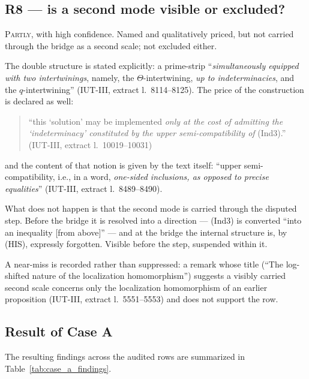 \documentclass[11pt,a4paper]{article}
\theoremstyle{definition}
\newcommand{\anchor}[2]{(#1, extract l.~#2)}
\begin{document}
\subsection{R8 --- is a second mode visible or excluded?}

\textsc{Partly}, with high confidence. Named and qualitatively priced, but not
carried through the bridge as a second scale; not excluded either.

The double structure is stated explicitly: a prime-strip ``\emph{simultaneously
equipped with two intertwinings}, namely, the $\Theta$-intertwining, \emph{up to
indeterminacies}, and the $q$-intertwining'' \anchor{IUT-III}{8114--8125}. The
price of the construction is declared as well:

\begin{quote}\small
``this `solution' may be implemented \emph{only at the cost of admitting the
`indeterminacy' constituted by the upper semi-compatibility of} (Ind3).''
\hfill\anchor{IUT-III}{10019--10031}
\end{quote}

and the content of that notion is given by the text itself: ``upper
semi-compatibility, i.e., in a word, \emph{one-sided inclusions, as opposed to
precise equalities}'' \anchor{IUT-III}{8489--8490}.

What does not happen is that the second mode is carried through the disputed
step. Before the bridge it is resolved into a direction --- (Ind3) is converted
``into an inequality [from above]'' --- and at the bridge the internal structure
is, by (HIS), expressly forgotten. Visible before the step, suspended within it.

A near-miss is recorded rather than suppressed: a remark whose title
(``The log-shifted nature of the localization homomorphism'') suggests a visibly
carried second scale concerns only the localization homomorphism of an earlier
proposition \anchor{IUT-III}{5551--5553} and does not support the row.

\subsection{Result of Case A}

The resulting findings across the audited rows are summarized in Table~\ref{tab:case_a_findings}.
\end{document}
